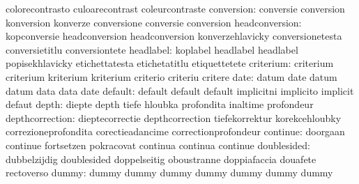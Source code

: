                            colorecontrasto           culoarecontrast
                           coleurcontraste
               conversion: conversie                 conversion
                           konversion                konverze
                           conversione               conversie
                           conversion
           headconversion: kopconversie              headconversion
                           headconversion            konverzehlavicky
                           conversionetesta          conversietitlu
                           conversiontete %
                headlabel: koplabel                  headlabel
                           headlabel                 popisekhlavicky
                           etichettatesta            etichetatitlu
                           etiquettetete
                criterium: criterium                 criterium
                           kriterium                 kriterium
                           criterio                  criteriu
                           critere
                     date: datum                     date
                           datum                     datum
                           data                      data
                           date
                  default: default                   default
                           default                   implicitni
                           implicito                 implicit
                           defaut
                    depth: diepte                    depth
                           tiefe                     hloubka
                           profondita                inaltime
                           profondeur
          depthcorrection: dieptecorrectie           depthcorrection
                           tiefekorrektur            korekcehloubky
                           correzioneprofondita      corectieadancime
                           correctionprofondeur
                 continue: doorgaan                  continue
                           fortsetzen                pokracovat
                           continua                  continua
                           continue
              doublesided: dubbelzijdig              doublesided
                           doppelseitig              oboustranne
                           doppiafaccia              douafete
                           rectoverso
                    dummy: dummy                     dummy
                           dummy                     dummy
                           dummy                     dummy
                           dummy
